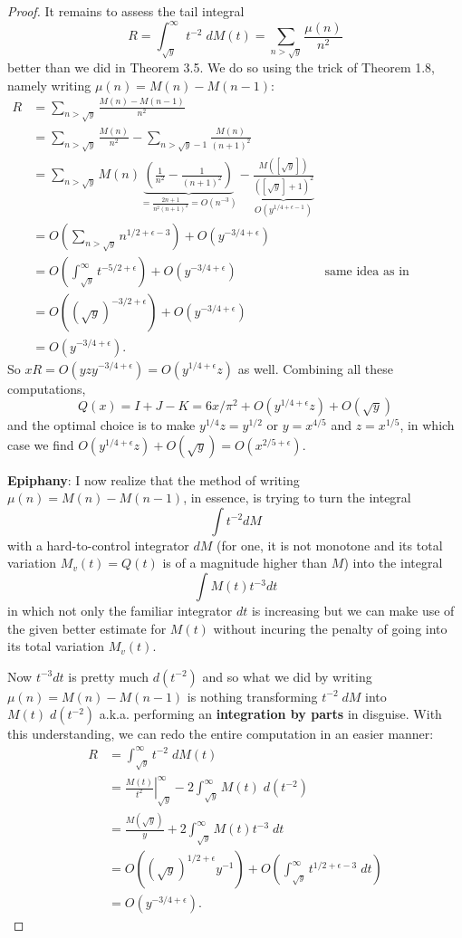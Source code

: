 \documentclass[12pt]{article}
\renewcommand{\O}[1]{O\left( #1 \right)}
\begin{document}
\begin{proof}
It remains to assess the tail integral
$$R = \int_{\sqrt y}^{\infty} t^{-2} \; dM(t) = \sum_{n > \sqrt y} \frac{\mu(n)}{n^2}$$
better than we did in Theorem 3.5. We do so using the trick of Theorem 1.8, namely writing $\mu(n) = M(n) - M(n - 1)$:
\begin{align*}
R &= \sum_{n > \sqrt y} \frac{M(n) - M(n - 1)}{n^2}\\
&= \sum_{n > \sqrt y} \frac{M(n)}{n^2} -  \sum_{n > \sqrt y - 1} \frac{M(n)}{(n+1)^2}\\
&= \sum_{n > \sqrt y} M(n) \underbrace{\left(\frac{1}{n^2} - \frac{1}{(n+1)^2}\right)}_{= \frac{2n + 1}{n^2 (n+1)^2} = \O{ n^{-3} }} - \underbrace{\frac{M([\sqrt y])}{([\sqrt y] + 1)^2}}_{\O{ y^{1/4 + \epsilon - 1} }}\\
&= \O{ \sum_{n > \sqrt y} n^{1/2 + \epsilon - 3} } + \O{ y^{-3/4 + \epsilon} }\\
&= \O{ \int_{\sqrt y}^{\infty} t^{-5/2 + \epsilon} } + \O{ y^{-3/4 + \epsilon} } &\text{same idea as in Theorem 3.5}\\
&= \O{ (\sqrt y)^{-3/2 + \epsilon} } + \O{ y^{-3/4 + \epsilon} }\\
&= \O{ y^{-3/4 + \epsilon} }.
\end{align*}
So $x R = \O{ yz y^{-3/4 + \epsilon} } = \O{ y^{1/4 + \epsilon} z }$ as well. Combining all these computations,
$$Q(x) = I + J - K = 6x/\pi^2 + \O{ y^{1/4 + \epsilon} z } + \O{ \sqrt y }$$
and the optimal choice is to make $y^{1/4} z = y^{1/2}$ or $y = x^{4/5}$ and $z = x^{1/5}$, in which case we find $\O{ y^{1/4 + \epsilon} z } + \O{ \sqrt y } = \O{ x^{2/5 + \epsilon} }$.

\textbf{Epiphany}: I now realize that the method of writing $\mu(n) = M(n) - M(n-1)$, in essence, is trying to turn the integral
$$\int t^{-2} dM$$
with a hard-to-control integrator $dM$ (for one, it is not monotone and its total variation $M_v(t) = Q(t)$ is of a magnitude higher than $M$) into the integral
$$\int M(t) t^{-3} dt$$
in which not only the familiar integrator $dt$ is increasing but we can make use of the given better estimate for $M(t)$ without incuring the penalty of going into its total variation $M_v(t)$.

Now $t^{-3} dt$ is pretty much $d(t^{-2})$ and so what we did by writing $\mu(n) = M(n) - M(n-1)$ is nothing transforming $t^{-2} \; dM$ into $M(t) \; d(t^{-2})$ a.k.a. performing an \textbf{integration by parts} in disguise. With this understanding, we can redo the entire computation in an easier manner:
\begin{align*}
R &= \int_{\sqrt y}^\infty t^{-2} \; dM(t)\\
&= \left. \frac{M(t)}{t^2} \right|_{\sqrt y}^{\infty} - 2 \int_{\sqrt y}^\infty M(t) \; d(t^{-2})\\
&= \frac{M(\sqrt y)}{y} + 2 \int_{\sqrt y}^\infty M(t) t^{-3} \; dt\\
&= \O{ (\sqrt y)^{1/2 + \epsilon} y^{-1} } + \O{ \int_{\sqrt y}^\infty t^{1/2 + \epsilon - 3} \; dt }\\
&= \O{ y^{-3/4 + \epsilon} }.
\end{align*}


\end{proof}
\end{document}
